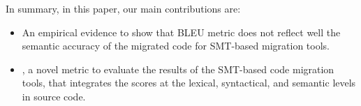 In summary, in this paper, our main contributions are:

\begin{itemize}
	\item An empirical evidence to show that BLEU metric does not reflect
well the semantic accuracy of the migrated code for SMT-based
migration tools.

	\item {\model}, a novel metric to evaluate the results of the SMT-based
code migration tools, that integrates the scores at the lexical,
syntactical, and semantic levels in source code.
\end{itemize}









